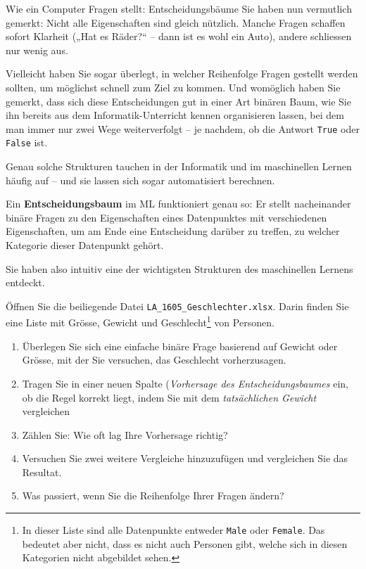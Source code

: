 \begin{lpu}{Wie ein Computer Fragen stellt: Entscheidungsbäume}
Sie haben nun vermutlich gemerkt: Nicht alle Eigenschaften sind gleich nützlich. Manche Fragen schaffen sofort Klarheit („Hat es Räder?“ – dann ist es wohl ein Auto), andere schliessen nur wenig aus.

Vielleicht haben Sie sogar überlegt, in welcher Reihenfolge Fragen gestellt werden sollten, um möglichst schnell zum Ziel zu kommen. Und womöglich haben Sie gemerkt, dass sich diese Entscheidungen gut in einer Art binären Baum, wie Sie ihn bereits aus dem Informatik-Unterricht kennen organisieren lassen, bei dem man immer nur zwei Wege weiterverfolgt – je nachdem, ob die Antwort \texttt{True} oder \texttt{False} ist.

Genau solche Strukturen tauchen in der Informatik und im maschinellen Lernen häufig auf – und sie lassen sich sogar automatisiert berechnen.

\begin{theorie}
Ein \textbf{Entscheidungsbaum} im ML funktioniert genau so: Er stellt nacheinander binäre Fragen zu den Eigenschaften eines Datenpunktes mit verschiedenen Eigenschaften, um am Ende eine Entscheidung darüber zu treffen, zu welcher Kategorie dieser Datenpunkt gehört.
\end{theorie}

Sie haben also intuitiv eine der wichtigsten Strukturen des maschinellen Lernens entdeckt.


\begin{aufgabe}{4}
Öffnen Sie die beiliegende Datei \texttt{LA\_1605\_Geschlechter.xlsx}. Darin finden Sie eine Liste mit Grösse, Gewicht und Geschlecht\footnote{In dieser Liste sind alle Datenpunkte entweder \texttt{Male} oder \texttt{Female}. Das bedeutet aber nicht, dass es nicht auch Personen gibt, welche sich in diesen Kategorien nicht abgebildet sehen.} von Personen.

\begin{enumerate}
  \item Überlegen Sie sich eine einfache binäre Frage basierend auf Gewicht oder Grösse, mit der Sie versuchen, das Geschlecht vorherzusagen.
  \item Tragen Sie in einer neuen Spalte (\textit{Vorhersage des Entscheidungsbaumes} ein, ob die Regel korrekt liegt, indem Sie mit dem \textit{tatsächlichen Gewicht} vergleichen
  \item Zählen Sie: Wie oft lag Ihre Vorhersage richtig?
  \item Versuchen Sie zwei weitere Vergleiche hinzuzufügen und vergleichen Sie das Resultat.
  \item Was passiert, wenn Sie die Reihenfolge Ihrer Fragen ändern?
\end{enumerate}
\end{aufgabe}


\end{lpu}
